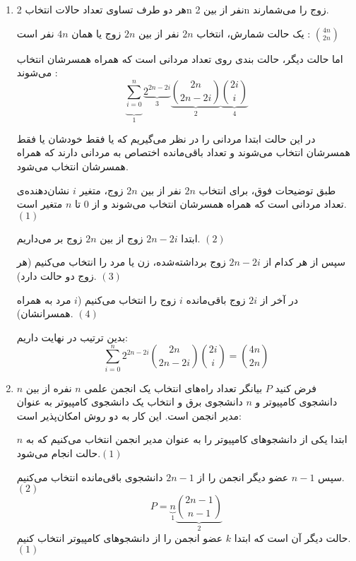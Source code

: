     \begin{enumerate}
        \item 
        هر دو طرف تساوی تعداد حالات انتخاب 2n نفر از بین 2n زوج را می‌شمارند.
        
        یک حالت شمارش، انتخاب $2n$ نفر از بین $2n$ زوج یا همان $4n$ نفر است : $\binom{4n}{2n}$
        
        اما حالت دیگر، حالت بندی روی تعداد مردانی است که همراه همسرشان انتخاب می‌شوند :
        $$\underbrace{\sum\limits_{i=0}^{n}}_1 \underbrace{2^{2n-2i}}_3  \underbrace{\binom{2n}{2n-2i}}_2 \underbrace{\binom{2i}{i}}_4$$
        
        در این حالت ابتدا مردانی را در نظر می‌گیریم که یا فقط خودشان یا فقط همسرشان انتخاب می‌شوند و تعداد باقی‌مانده اختصاص به مردانی دارند که همراه همسرشان انتخاب می‌شود.
        
        طبق توضیحات فوق، برای انتخاب 
        $2n$
        نفر از بین
        $2n$
        زوج، متغیر
        $i$
        نشان‌دهنده‌ی
        تعداد مردانی است که همراه همسرشان انتخاب می‌شوند و از 0 تا $n$ متغیر است. $(1)$
        
        ابتدا $2n-2i$ زوج از بین $2n$ زوج بر می‌داریم. $(2)$
        
        سپس از هر کدام از $2n-2i$ زوج برداشته‌شده، زن یا مرد را انتخاب می‌کنیم (هر زوج دو حالت دارد). $(3)$
        
        در آخر از $2i$ زوج باقی‌مانده $i$ زوج را انتخاب می‌کنیم ($i$ مرد به همراه همسرانشان). $(4)$
        
        بدین ترتیب در نهایت داریم:
        $$\sum\limits_{i=0}^{n} 2^{2n-2i} \binom{2n}{2n-2i} \binom{2i}{i} = \binom{4n}{2n}$$
        \item
    
        فرض کنید
        $P$
        بیانگر تعداد راه‌های انتخاب یک انجمن علمی
        $n$
        نفره از بین
        $n$
        دانشجوی کامپیوتر و 
        $n$
        دانشجوی برق و انتخاب یک دانشجوی کامپیوتر به عنوان مدیر انجمن است. این کار به دو روش امکان‌پذیر است:
        
        ابتدا یکی از دانشجو‌های کامپیوتر را به عنوان مدیر انجمن انتخاب می‌کنیم که به 
        $n$
        حالت انجام می‌شود.$(1)$
        
        سپس 
        $n-1$
        عضو دیگر انجمن را از
        $2n-1$
        دانشجوی باقی‌مانده انتخاب می‌کنیم.$(2)$
        $$P = \underbrace{n}_1 \underbrace{\binom{2n-1}{n-1}}_2$$
        حالت دیگر آن است که ابتدا 
        $k$
        عضو انجمن را از دانشجو‌های کامپیوتر 
        انتخاب کنیم.$(1)$
        

\end{enumerate}
